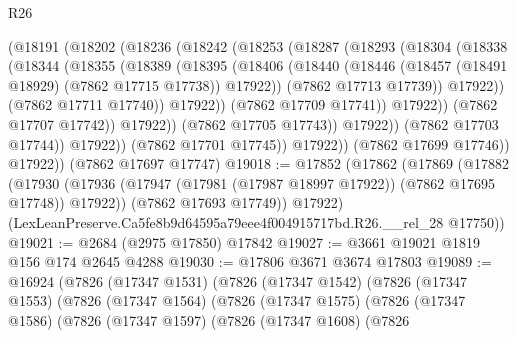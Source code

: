 \begin{lexlean}{R26}
\begin{coremodule}
                        (@18191
                          (@18202
                            (@18236
                              (@18242
                                (@18253
                                  (@18287
                                    (@18293
                                      (@18304
                                        (@18338
                                          (@18344
                                            (@18355
                                              (@18389
                                                (@18395
                                                  (@18406
                                                    (@18440
                                                      (@18446
                                                        (@18457
                                                          (@18491 @18929)
                                                          (@7862 @17715 @17738))
                                                        @17922))
                                                    (@7862 @17713 @17739))
                                                  @17922))
                                              (@7862 @17711 @17740))
                                            @17922))
                                        (@7862 @17709 @17741))
                                      @17922))
                                  (@7862 @17707 @17742))
                                @17922))
                            (@7862 @17705 @17743))
                          @17922))
                      (@7862 @17703 @17744))
                    @17922))
                (@7862 @17701 @17745))
              @17922))
          (@7862 @17699 @17746))
        @17922))
    (@7862 @17697 @17747)
@19018 := @17852
    (@17862
      (@17869
        (@17882
          (@17930 (@17936 (@17947 (@17981 (@17987 @18997 @17922)) (@7862 @17695 @17748)) @17922))
          (@7862 @17693 @17749))
        @17922)
      (LexLeanPreserve.Ca5fe8b9d64595a79eee4f004915717bd.R26.__rel_28 @17750))
@19021 := @2684 (@2975 @17850) @17842
@19027 := @3661 @19021 @1819 @156 @174 @2645 @4288
@19030 := @17806 @3671 @3674 @17803
@19089 := @16924
    (@7826
      (@17347 @1531)
      (@7826
        (@17347 @1542)
        (@7826
          (@17347 @1553)
          (@7826
            (@17347 @1564)
            (@7826
              (@17347 @1575)
              (@7826
                (@17347 @1586)
                (@7826
                  (@17347 @1597)
                  (@7826
                    (@17347 @1608)
                    (@7826

\end{coremodule}
\end{lexlean}
